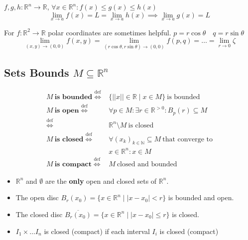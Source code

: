 \documentclass[a4paper, 10pt]{article}
\theoremstyle{definition}
\newcommand{\R}{\mathbb{R}}
\newcommand{\N}{\mathbb{N}}
\newcommand{\defi}{\stackrel{\text{def}}{\iff}}
\begin{document}
\begin{ntheorem*}
    \(f, g, h : \R^n \to \R\), \(\forall x \in \R^n: f(x) \leq g(x) \leq h(x)\)
    \[\lim_{x \to a} f(x) = L = \lim_{x \to a} h(x) \implies \lim_{x \to a}g(x) = L\]
\end{ntheorem*}

\begin{note*}
    For \(f: \R^2 \to \R\) polar coordinates are sometimes helpful.
    \(p = r \cos \theta \quad q = r \sin \theta\)
    \[\lim_{(x, y) \to (0, 0)}f(x, y) = \lim_{(r\cos\theta, r\sin\theta) \to (0,0)}f(p, q) = \ldots = \lim_{r \to 0} \zeta\]
\end{note*}

\subsection{Sets Bounds \(M \subseteq \R^n\)}
\vspace{-8pt}
\begin{align*}
    M \ \textbf{is bounded} \defi & \{||x|| \in \R \mid x \in M\} \ \text{is bounded} \\
    M \ \textbf{is open} \defi & \forall p \in M: \exists r \in \R^{>0}: B_p(r) \subseteq M \\
    \defi & \R^n \setminus M \ \text{is closed}\\
    M \ \textbf{is closed} \defi & \forall (x_k)_{k \in \N} \subseteq M \ \text{that converge to} \\
    & x \in \R^n: x \in M \\
    M \ \textbf{is compact} \defi& M \ \text{closed and bounded}
\end{align*}

\begin{note*}
    \begin{itemize}
        \item \(\R^n\) and \(\emptyset\) are the \textbf{only} open and  closed sets of \(\R^n\).
        \item The open disc \(B_r(x_0) = \{x \in \R^n \mid |x - x_0| < r\}\) is bounded and open.
        \item The closed disc \(\overline{B_r(x_0)} = \{x \in \R^n \mid |x - x_0| \leq r\}\) is closed.
        \item \(I_1 \times \ldots I_n\) is closed (compact) if each interval \(I_i\) is closed (compact)
    \end{itemize}
\end{note*}
\end{document}
